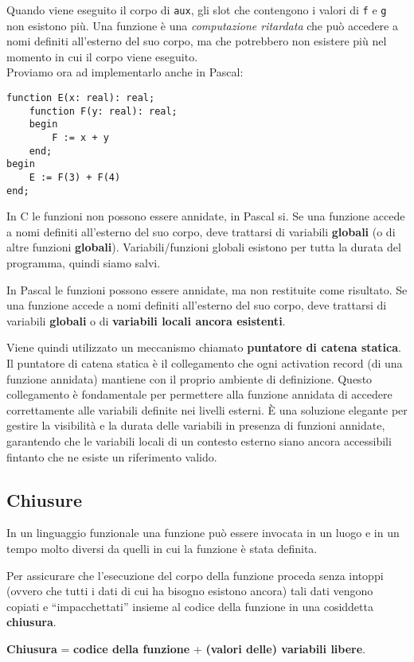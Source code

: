 \documentclass{article}
\begin{document}
Quando viene eseguito il corpo di \texttt{aux}, gli slot che contengono i valori di \texttt{f} e \texttt{g} non esistono più. Una funzione è una \textit{computazione ritardata} che può accedere a nomi definiti all’esterno del suo corpo, ma che potrebbero non esistere più nel momento in cui il corpo viene eseguito.\vspace{14pt}\\
Proviamo ora ad implementarlo anche in Pascal:
\begin{tcolorbox}
\begin{verbatim}
function E(x: real): real;
    function F(y: real): real;
    begin
        F := x + y
    end;
begin
    E := F(3) + F(4)
end;
\end{verbatim}
\end{tcolorbox}

In C le funzioni non possono essere annidate, in Pascal si. Se una funzione accede a nomi definiti all’esterno del suo corpo, deve trattarsi di variabili \textbf{globali} (o di altre funzioni \textbf{globali}).
Variabili/funzioni globali esistono per tutta la durata del programma, quindi siamo salvi.

In Pascal le funzioni possono essere annidate, ma non restituite come risultato. Se una funzione accede a nomi definiti all’esterno del suo corpo, deve trattarsi di variabili \textbf{globali} o di \textbf{variabili locali ancora esistenti}.

Viene quindi utilizzato un meccanismo chiamato \textbf{puntatore di catena statica}. Il puntatore di catena statica è il collegamento che ogni activation record (di una funzione annidata) mantiene con il proprio ambiente di definizione. Questo collegamento è fondamentale per permettere alla funzione annidata di accedere correttamente alle variabili definite nei livelli esterni. È una soluzione elegante per gestire la visibilità e la durata delle variabili in presenza di funzioni annidate, garantendo che le variabili locali di un contesto esterno siano ancora accessibili fintanto che ne esiste un riferimento valido.

\subsection*{Chiusure}
In un linguaggio funzionale una funzione può essere invocata in un luogo e in un tempo molto diversi da quelli in cui la funzione è stata definita.

Per assicurare che l’esecuzione del corpo della funzione proceda senza intoppi (ovvero che tutti i dati di cui ha bisogno esistono ancora) tali dati vengono copiati e “impacchettati” insieme al codice della funzione in una cosiddetta \textbf{chiusura}.
\begin{center}
    \textbf{Chiusura} = \textbf{codice della funzione} + \textbf{(valori delle) variabili libere}.    
\end{center}
\vspace{14pt}
\end{document}
